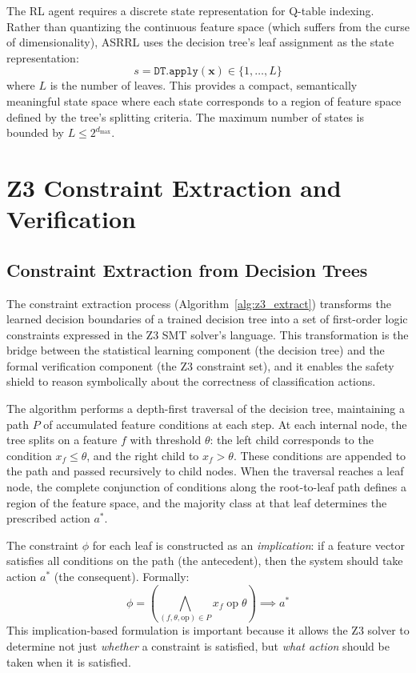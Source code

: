 \documentclass[12pt, letterpaper, oneside]{report}
\newcommand{\ASRRL}{\textsc{ASRRL}}
\newcommand{\bx}{\mathbf{x}}
\begin{document}
The RL agent requires a discrete state representation for Q-table indexing. Rather than quantizing the continuous feature space (which suffers from the curse of dimensionality), \ASRRL{} uses the decision tree's leaf assignment as the state representation:
\begin{equation}
\label{eq:discretization}
s = \texttt{DT.apply}(\bx) \in \{1, \ldots, L\}
\end{equation}
where $L$ is the number of leaves. This provides a compact, semantically meaningful state space where each state corresponds to a region of feature space defined by the tree's splitting criteria. The maximum number of states is bounded by $L \leq 2^{d_{\max}}$.


\section{Z3 Constraint Extraction and Verification}
\label{sec:z3_constraints}

\subsection{Constraint Extraction from Decision Trees}

The constraint extraction process (Algorithm~\ref{alg:z3_extract}) transforms the learned decision boundaries of a trained decision tree into a set of first-order logic constraints expressed in the Z3 SMT solver's language. This transformation is the bridge between the statistical learning component (the decision tree) and the formal verification component (the Z3 constraint set), and it enables the safety shield to reason symbolically about the correctness of classification actions.

The algorithm performs a depth-first traversal of the decision tree, maintaining a path $P$ of accumulated feature conditions at each step. At each internal node, the tree splits on a feature $f$ with threshold $\theta$: the left child corresponds to the condition $x_f \leq \theta$, and the right child to $x_f > \theta$. These conditions are appended to the path and passed recursively to child nodes. When the traversal reaches a leaf node, the complete conjunction of conditions along the root-to-leaf path defines a region of the feature space, and the majority class at that leaf determines the prescribed action $a^*$.

The constraint $\phi$ for each leaf is constructed as an \emph{implication}: if a feature vector satisfies all conditions on the path (the antecedent), then the system should take action $a^*$ (the consequent). Formally:
\begin{equation}
\phi = \left(\bigwedge_{(f, \theta, \text{op}) \in P} x_f \;\text{op}\; \theta\right) \implies a^*
\end{equation}
This implication-based formulation is important because it allows the Z3 solver to determine not just \emph{whether} a constraint is satisfied, but \emph{what action} should be taken when it is satisfied.
\end{document}
